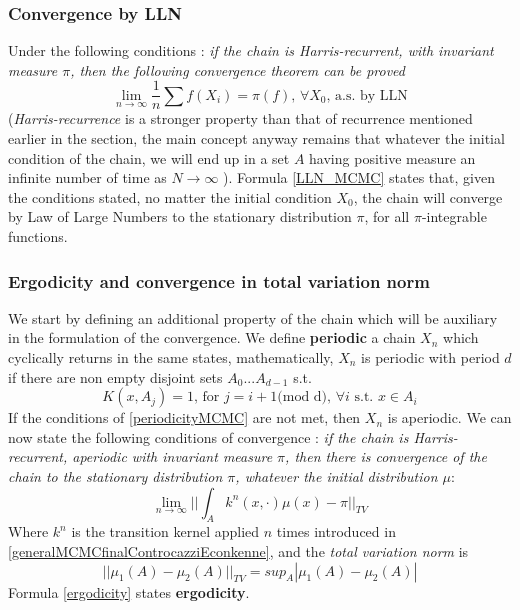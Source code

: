 \documentclass[12pt,mythesisstyle]{report}
\begin{document}
\subsubsection{Convergence by LLN}
Under the following conditions \cite{RobertCasella}: \textit{if the chain is Harris-recurrent, with invariant measure $\pi$, then the following convergence theorem can be proved} 
\begin{equation}\label{LLN_MCMC}
\lim_{n\to\infty} \frac{1}{n} \sum f(X_i)=\pi(f)\text{, }\forall X_0\text{, a.s. by LLN}
\end{equation}
(\textit{Harris-recurrence} is a stronger property than that of recurrence mentioned earlier in the section, the main concept anyway remains that whatever the initial condition of the chain, we will end up in a set $A$ having positive measure an infinite number of time as $N\rightarrow \infty$ \cite{RobertCasella}). Formula \eqref{LLN_MCMC} states that, given the conditions stated, no matter the initial condition $X_0$, the chain will converge by Law of Large Numbers to the stationary distribution $\pi$, for all $\pi$-integrable functions.

\subsubsection{Ergodicity and convergence in total variation norm}
We start by defining an additional property of the chain which will be auxiliary in the formulation of the convergence. We define \textbf{periodic} a chain $X_n$ which cyclically returns in the same states, mathematically, $X_n$ is periodic with period $d$ if there are non empty disjoint sets $A_0...A_{d-1}$ s.t.
\begin{equation}\label{periodicityMCMC}
K(x,A_j)=1 \text{, for } j=i+1 \text{(mod d)} \text{, } \forall i \text{ s.t. } x \in A_i
\end{equation}
If the conditions of \eqref{periodicityMCMC} are not met, then $X_n$ is aperiodic.
We can now state the following conditions of convergence \cite{RobertCasella}: \textit{if the chain is Harris-recurrent, aperiodic with invariant measure $\pi$, then there is convergence of the chain to the stationary distribution $\pi$, whatever the initial distribution $\mu$}:
\begin{equation}\label{ergodicity}
\lim_{n\to\infty} \bigg|\bigg|\int_{A} k^n(x,\cdot)\mu(x) -\pi \bigg|\bigg|_{TV}
\end{equation}
Where $k^n$ is the transition kernel applied $n$ times introduced in \eqref{generalMCMCfinalControcazziEconkenne}, and the\textit{ total variation norm }is
\begin{equation}\label{totalVariationNormMCMC}
\big|\big| \mu_1(A)-\mu_2(A)\big|\big|_{TV}=sup_A |\mu_1(A) - \mu_2(A)|
\end{equation}
Formula \eqref{ergodicity} states \textbf{ergodicity}.
\end{document}
